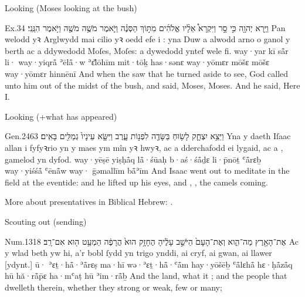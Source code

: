 \begin{frame}{\ex Looking (Moses looking at the bush)}
	\begin{example}{Ex.}{3}{4}{}{}
		\quoling
		{וַיַּ֥רְא יְהוָ֖ה כִּ֣י סָ֣ר  וַיִּקְרָא֩ אֵלָ֨יו אֱלֹהִ֜ים מִתּ֣וֹךְ הַסְּנֶ֗ה וַיֹּ֛אמֶר מֹשֶׁ֥ה מֹשֶׁ֖ה וַיֹּ֥אמֶר הִנֵּֽנִי׃}
		{Pan welodd yꝛ Arglwydd mai cilio yꝛ oedd efe i : yna Duw a alwodd arno o ganol y berth ac a ddywedodd Moſes, Moſes: a dywedodd yntef wele fi.}
		{way·yar {\YHWH} kī så̄r li· way·yiqrå̄ ʾēlå̄·w ʾɛ̆lōhīm mit·tōḵ has·sənɛ way·yōmɛr mōšɛ mōšɛ way·yōmɛr hinnēnī}
		{And when the {\LORD} saw that he turned aside to see, God called unto him out of the midst of the bush, and said, Moses, Moses. And he said, Here  I.}
	\end{example}
\end{frame}


\begin{frame}{\ex Looking (+what has appeared)}
	\begin{example}{Gen.}{24}{63}{}{}
		\quoling
		{וַיֵּצֵ֥א יִצְחָ֛ק לָשׂ֥וּחַ בַּשָּׂדֶ֖ה לִפְנ֣וֹת עָ֑רֶב וַיִּשָּׂ֤א עֵינָיו֙   גְמַלִּ֖ים בָּאִֽים׃}
		{Yna y daeth Iſaac allan i fyfyꝛrio yn y maes ym mîn yꝛ hwyꝛ, ac a dderchafodd ei lygaid, ac a ,  gamelod yn dyfod.}
		{way·yēṣē yiṣḥå̄q lå̄·śūaḥ b·aś·śå̄ḏɛ li·p̄nōṯ ʿå̄rɛḇ way·yiśśå̄ ʿēnå̄w way·  ḡəmallīm bå̄ʾīm}
		{And Isaac went out to meditate in the field at the eventide: and he lifted up his eyes, and , , the camels  coming.}
	\end{example}

	\vfill

	{\footnotesize More about presentatives in Biblical Hebrew: \cite{cohen.e:2014:presentatives}.}
\end{frame}


\begin{frame}{\ex Scouting out (sending)}
	\begin{example}{Num.}{13}{18}{}{}
		\quoling
		{ אֶת־הָאָ֖רֶץ מַה־הִ֑וא וְאֶת־הָעָם֙ הַיֹּשֵׁ֣ב עָלֶ֔יהָ הֶחָזָ֥ק הוּא֙ הֲרָפֶ֔ה הַמְעַ֥ט ה֖וּא אִם־רָֽב׃}
		{Ac  y wlad beth yw hi, a’r bobl ſydd yn trigo ynddi, ai cryf, ai gwan, ai llawer [ydynt.]}
		{ū· ʾɛṯ·hå̄·ʾå̄rɛṣ ma·hī wə·ʾɛṯ·hå̄·ʿå̄m hay·yōšēḇ ʿå̄lɛhå̄ hɛ·ḥå̄zå̄q hū hă·rå̄p̄ɛ ha·mʿaṭ hū ʾim·rå̄ḇ}
		{And  the land, what it ; and the people that dwelleth therein, whether they  strong or weak, few or many;}
	\end{example}
\end{frame}


